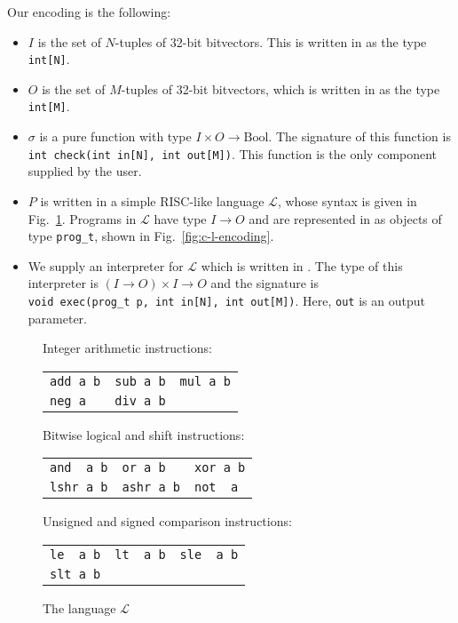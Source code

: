 Our encoding is the following:
%
\begin{itemize}
 \item $I$ is the set of $N$-tuples of 32-bit bitvectors.  This is written in \newC as the type \verb|int[N]|.
 \item $O$ is the set of $M$-tuples of 32-bit bitvectors, which is written in \newC as the type \verb|int[M]|.
 \item $\sigma$ is a pure function with type $I \times O \rightarrow \mathrm{Bool}$.  The \newC signature of this function is
 \verb|int check(int in[N], int out[M])|. This function is the only component supplied
 by the user.
 \item $P$ is written in a simple RISC-like language $\mathcal{L}$, whose syntax is given in Fig.~\ref{fig:l-language}.  Programs in $\mathcal{L}$
 have type $I \rightarrow O$ and
 are represented in \newC as objects of type \verb|prog_t|, shown in Fig.~\ref{fig:c-l-encoding}.
 \item We supply an interpreter for $\mathcal{L}$ which is written in \newC.  The type of
 this interpreter is $(I \rightarrow O) \times I \rightarrow O$ and the \newC signature is \\
 \verb|void exec(prog_t p, int in[N], int out[M])|.  Here, \verb|out| is an output parameter.
\end{itemize}

\begin{figure}
{\small
\begin{center}
\setlength{\tabcolsep}{16pt}
Integer arithmetic instructions:

\begin{tabular}{lll}
 \verb|add a b| & \verb|sub a b| & \verb|mul a b| \\
 \verb|neg a| & \verb|div a b|  & 
\end{tabular}

\medskip

Bitwise logical and shift instructions:

\begin{tabular}{lll}
 \verb|and  a b| & \verb|or a b| & \verb|xor a b| \\
 \verb|lshr a b| & \verb|ashr a b| & \verb|not  a| 
\end{tabular}

\medskip

Unsigned and signed comparison instructions:

\begin{tabular}{lll}
 \verb|le  a b| & \verb|lt  a b| & \verb|sle  a b| \\
 \verb|slt a b| & &
\end{tabular}
\end{center}
}
 \caption{The language $\mathcal{L}$}
 \label{fig:l-language}
\end{figure}


